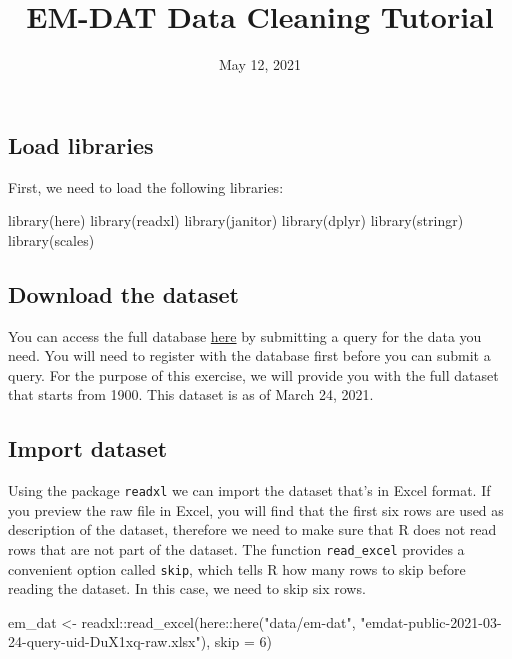\documentclass[
  12pt,
]{article}
\title{EM-DAT Data Cleaning Tutorial}
\author{}
\date{\vspace{-2.5em}May 12, 2021}
\newenvironment{Shaded}{}{}
\newcommand{\AttributeTok}[1]{\textcolor[rgb]{0.49,0.56,0.16}{#1}}
\newcommand{\DecValTok}[1]{\textcolor[rgb]{0.25,0.63,0.44}{#1}}
\newcommand{\FunctionTok}[1]{\textcolor[rgb]{0.02,0.16,0.49}{#1}}
\newcommand{\NormalTok}[1]{#1}
\newcommand{\OtherTok}[1]{\textcolor[rgb]{0.00,0.44,0.13}{#1}}
\newcommand{\SpecialCharTok}[1]{\textcolor[rgb]{0.25,0.44,0.63}{#1}}
\newcommand{\StringTok}[1]{\textcolor[rgb]{0.25,0.44,0.63}{#1}}
\renewcommand\maketitle{}
\begin{document}
\maketitle

\hypertarget{load-libraries}{%
\subsection{Load libraries}\label{load-libraries}}

First, we need to load the following libraries:

\begin{Shaded}
\begin{Highlighting}[]
\FunctionTok{library}\NormalTok{(here)}
\FunctionTok{library}\NormalTok{(readxl)}
\FunctionTok{library}\NormalTok{(janitor)}
\FunctionTok{library}\NormalTok{(dplyr)}
\FunctionTok{library}\NormalTok{(stringr)}
\FunctionTok{library}\NormalTok{(scales)}
\end{Highlighting}
\end{Shaded}

\hypertarget{download-the-dataset}{%
\subsection{Download the dataset}\label{download-the-dataset}}

You can access the full database \href{https://public.emdat.be/}{here}
by submitting a query for the data you need. You will need to register
with the database first before you can submit a query. For the purpose
of this exercise, we will provide you with the full dataset that starts
from 1900. This dataset is as of March 24, 2021.

\hypertarget{import-dataset}{%
\subsection{Import dataset}\label{import-dataset}}

Using the package \texttt{readxl} we can import the dataset that's in
Excel format. If you preview the raw file in Excel, you will find that
the first six rows are used as description of the dataset, therefore we
need to make sure that R does not read rows that are not part of the
dataset. The function \texttt{read\_excel} provides a convenient option
called \texttt{skip}, which tells R how many rows to skip before reading
the dataset. In this case, we need to skip six rows.

\begin{Shaded}
\begin{Highlighting}[]
\NormalTok{em\_dat }\OtherTok{\textless{}{-}}\NormalTok{ readxl}\SpecialCharTok{::}\FunctionTok{read\_excel}\NormalTok{(here}\SpecialCharTok{::}\FunctionTok{here}\NormalTok{(}\StringTok{"data/em{-}dat"}\NormalTok{, }
    \StringTok{"emdat{-}public{-}2021{-}03{-}24{-}query{-}uid{-}DuX1xq{-}raw.xlsx"}\NormalTok{), }
    \AttributeTok{skip =} \DecValTok{6}\NormalTok{)}
\end{Highlighting}
\end{Shaded}
\end{document}
